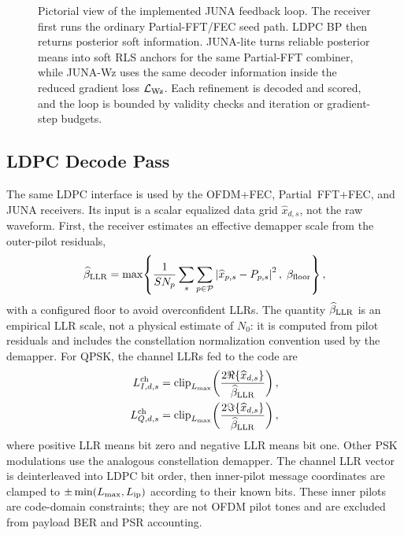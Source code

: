 \documentclass[journal]{IEEEtran}
\newcommand{\abs}[1]{\left\lvert #1 \right\rvert}
\newcommand{\juna}{JUNA}
\newcommand{\junalite}{JUNA-lite}
\newcommand{\junawz}{JUNA-Wz}
\begin{document}
\begin{figure}[t]
{%
}
\caption{Pictorial view of the implemented \juna{} feedback loop. The receiver
first runs the ordinary Partial-FFT/FEC seed path. LDPC BP then returns
posterior soft information. \junalite{} turns reliable posterior means into
soft RLS anchors for the same Partial-FFT combiner, while \junawz{} uses the
same decoder information inside the reduced gradient loss
\(\mathcal L_{\rm Wz}\). Each refinement is decoded and scored, and the loop is
bounded by validity checks and iteration or gradient-step budgets.}
\label{fig:juna-iterative-loop}
\end{figure}

\subsection{LDPC Decode Pass}
The same LDPC interface is used by the OFDM+FEC, Partial~FFT+FEC, and \juna{}
receivers. Its input is a scalar equalized data grid
$\widehat x_{d,s}$, not the raw waveform. First, the receiver estimates an
effective demapper scale from the outer-pilot residuals,
\begin{equation}
  \widehat\beta_{\rm LLR}
  =\max\!\left\{
    \frac{1}{SN_p}\sum_{s}\sum_{p\in\mathcal P}
      \abs{\widehat x_{p,s}-P_{p,s}}^2,\;
    \beta_{\rm floor}
  \right\},
  \label{eq:fec-sigma}
\end{equation}
with a configured floor to avoid overconfident LLRs. The quantity
$\widehat\beta_{\rm LLR}$ is an empirical LLR scale, not a physical estimate of
$N_0$: it is computed from pilot residuals and includes the constellation
normalization convention used by the demapper. For QPSK, the channel LLRs fed to
the code are
\begin{equation}
  \begin{aligned}
  L^{\rm ch}_{I,d,s}
    &=\mathrm{clip}_{L_{\max}}\!\left(
      \frac{2\Re\{\widehat x_{d,s}\}}
      {\widehat\beta_{\rm LLR}}\right),\\
  L^{\rm ch}_{Q,d,s}
    &=\mathrm{clip}_{L_{\max}}\!\left(
      \frac{2\Im\{\widehat x_{d,s}\}}
      {\widehat\beta_{\rm LLR}}\right),
  \end{aligned}
  \label{eq:qpsk-channel-llr}
\end{equation}
where positive LLR means bit zero and negative LLR means bit one. Other PSK
modulations use the analogous constellation demapper. The channel LLR vector is
deinterleaved into LDPC bit order, then inner-pilot message coordinates are
clamped to $\pm\min(L_{\max},L_{\rm ip})$ according to their known bits. These
inner pilots are code-domain constraints; they are not OFDM pilot tones and are
excluded from payload BER and PSR accounting.
\end{document}
